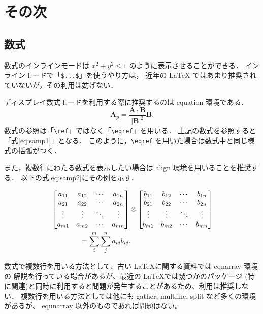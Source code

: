 \chapter{その次}
\label{chp:second}

\section{数式}
\label{sec:eqn}

数式のインラインモードは \(x^2 + y^2 \leq 1\) のように表示させることができる．
インラインモードで「\verb+$...$+」を使うやり方は，
近年の LaTeX ではあまり推奨されていないが，その利用は妨げない．

ディスプレイ数式モードを利用する際に推奨するのは equation 環境である．
\begin{equation}
	\mathbf{A}_p = \frac{\mathbf{A}\cdot\mathbf{B}}{|\mathbf{B}|^2}\mathbf{B} .
	\label{eq:samp1}
\end{equation}
数式の参照は「\verb+\ref+」ではなく「\verb+\eqref+」を用いる．
上記の数式を参照すると「式\eqref{eq:samp1}」となる．
このように，\verb+\eqref+ を用いた場合は数式中と同じ様式の括弧がつく．

また，複数行にわたる数式を表示したい場合は align 環境を用いることを推奨する．
以下の式\eqref{eq:samp2}にその例を示す．

\begin{align}
	& \begin{bmatrix}
	a_{11} & a_{12} & \cdots & a_{1n} \\
	a_{21} & a_{22} & \cdots & a_{2n} \\
	\vdots & \vdots & \ddots & \vdots \\
	a_{m1} & a_{m2} & \cdots & a_{mn} \\
	\end{bmatrix}
	\otimes
	\begin{bmatrix}
	b_{11} & b_{12} & \cdots & b_{1n} \\
	b_{21} & b_{22} & \cdots & b_{2n} \\
	\vdots & \vdots & \ddots & \vdots \\
	b_{m1} & b_{m2} & \cdots & b_{mn} \\
	\end{bmatrix} \notag \\
	& \qquad \qquad = \sum_{i}^{m}\sum_{j}^{n}a_{ij}b_{ij} .
	\label{eq:samp2}
\end{align}

数式で複数行を用いる方法として、古い \LaTeX に関する資料では eqnarray 環境の
解説を行っている場合があるが、最近の \LaTeX では幾つかのパッケージ
(特に\AmS 関連)と同時に利用すると問題が発生することがあるため、利用は推奨しない．
複数行を用いる方法としては他にも gather, multline, split など多くの環境があるが、
equnarray 以外のものであれば問題はない。

